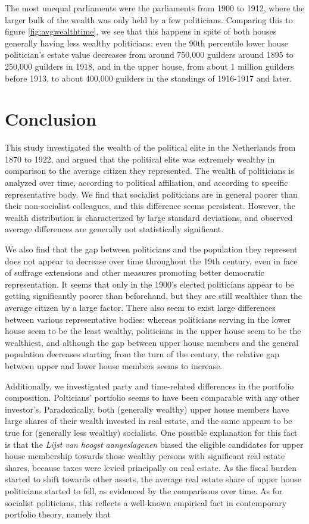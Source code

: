     The most unequal parliaments were the parliaments from 1900 to 1912, where the larger bulk of the wealth was only held by a few politicians. Comparing this to figure \ref{fig:avgwealthtime}, we see that this happens in spite of both houses generally having less wealthy politicians: even the 90th percentile lower house politician's estate value decreases from around 750,000 guilders around 1895 to 250,000 guilders in 1918, and in the upper house, from about 1 million guilders before 1913, to about 400,000 guilders in the standings of 1916-1917 and later. 
    

\section{Conclusion}

    This study investigated the wealth of the political elite in the Netherlands from 1870 to 1922, and argued that the political elite was extremely wealthy in comparison to the average citizen they represented. The wealth of politicians is analyzed over time, according to political affiliation, and according to specific representative body. We find that socialist politicians are in general poorer than their non-socialist colleagues, and this difference seems persistent. However, the wealth distribution is characterized by large standard deviations, and observed average differences are generally not statistically significant. 

    We also find that the gap between politicians and the population they represent does not appear to decrease over time throughout the 19th century, even in face of suffrage extensions and other measures promoting better democratic representation. It seems that only in the 1900's elected politicians appear to be getting significantly poorer than beforehand, but they are still wealthier than the average citizen by a large factor. There also seem to exist large differences between various representative bodies: whereas politicians serving in the lower house seem to be the least wealthy, politicians in the upper house seem to be the wealthiest, and although the gap between upper house members and the general population decreases starting from the turn of the century, the relative gap between upper and lower house members seems to increase. 

    Additionally, we investigated party and time-related differences in the portfolio composition. Polticians' portfolio seems to have been comparable with any other investor's. Paradoxically, both (generally wealthy) upper house members have large shares of their wealth invested in real estate, and the same appears to be true for (generally less wealthy) socialists. One possible explanation for this fact is that the \textit{Lijst van hoogst aangeslagenen} biased the eligible candidates for upper house membership towards those wealthy persons with significant real estate shares, because taxes were levied principally on real estate. As the fiscal burden started to shift towards other assets, the average real estate share of upper house politicians started to fell, as evidenced by the comparisons over time. As for socialist politicians, this reflects a well-known empirical fact in contemporary portfolio theory, namely that 

